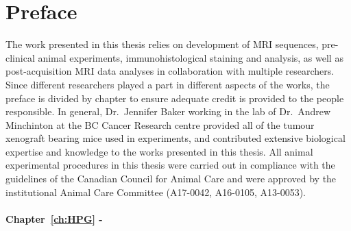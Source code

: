 
\chapter{Preface}
\label{ch:preface}

The work presented in this thesis relies on development of MRI sequences, pre-clinical animal experiments, immunohistological staining and analysis, as well as post-acquisition MRI data analyses in collaboration with multiple researchers.
Since different researchers played a part in different aspects of the works, the preface is divided by chapter to ensure adequate credit is provided to the people responsible.
In general, Dr.\ Jennifer Baker working in the lab of Dr.\ Andrew Minchinton at the BC Cancer Research centre provided all of the tumour xenograft bearing mice used in experiments, and contributed extensive biological expertise and knowledge to the works presented in this thesis.
All animal experimental procedures in this thesis were carried out in compliance with the guidelines of the Canadian Council for Animal Care and were approved by the institutional Animal Care Committee (A17-0042, A16-0105, A13-0053).

%

\subsubsection{Chapter~\ref{ch:HPG} - }

